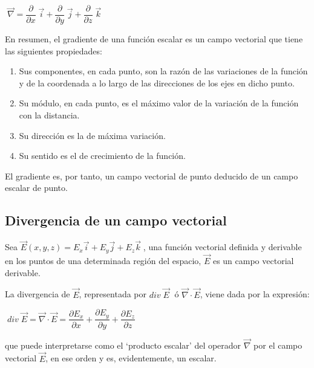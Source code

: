 \centerline{ $\boxed{ \; \overrightarrow {\nabla}=  \dfrac {\partial }{\partial x}\; \vec i +  \dfrac {\partial }{\partial y}\; \vec j +  \dfrac {\partial }{\partial z}\; \vec k \; }$}

\vspace{3mm}En resumen, el gradiente de una función escalar es un campo vectorial que tiene las siguientes propiedades:

 \begin{enumerate}

\item Sus componentes, en cada punto, son la razón de las variaciones de la función y de la coordenada a lo largo de las direcciones de los ejes en dicho punto. 

\item Su módulo, en cada punto, es el máximo valor de la variación de la función con la distancia. 

\item Su dirección es la de máxima variación. 

\item Su sentido es el de crecimiento de la función.

 \end{enumerate}
 
 El gradiente es, por tanto, un campo vectorial de punto deducido de un campo escalar de punto.
 
 \subsection{Divergencia de un campo vectorial}
 
 Sea $\vec E (x,y,z)=E_x \vec i + E_y \vec j + E_z \vec k\;$, una función vectorial definida y derivable en los puntos de una determinada región del espacio, $\vec E$ es un campo vectorial derivable.
 
 La divergencia de $\vec E$, representada por $div\; \vec E\;$ ó $\overrightarrow{\nabla}\cdot \vec E$, viene dada por la expresión:
 
 \vspace{4mm}\centerline{$\boxed{\; div\; \vec E = \overrightarrow{\nabla}\cdot \vec E = \dfrac {\partial E_x}{\partial x } + \dfrac {\partial E_y}{\partial y }+ \dfrac {\partial E_z}{\partial z } \; }$} 
 
 \vspace{3mm} que puede interpretarse como el `producto escalar' del operador $\overrightarrow{\nabla}$ por el campo vectorial $\vec E$, en ese orden y es, evidentemente, un escalar.
 
